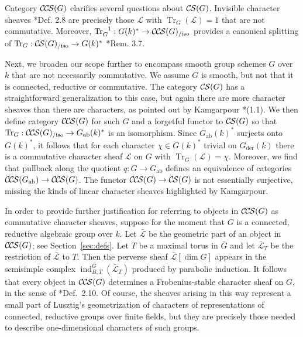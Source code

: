 \documentclass[10pt]{amsart}
\theoremstyle{plain}
\theoremstyle{definition}
\newcommand{\Fq}{k}
\newcommand{\der}{_{\operatorname{der}}}
\newcommand{\ab}{_{\operatorname{ab}}}
\DeclareMathOperator{\Tr}{Tr}
\newcommand{\TrFrob}[1]{\Tr_{#1}}
\newcommand{\cs}[1]{{\mathcal{#1}}}
\newcommand{\gcs}[1]{{\mathcal{\bar #1}}}
\newcommand{\CS}{{\mathcal{C\hskip-0.8pt S}}}
\newcommand{\CCS}{{\mathcal{C\hskip-.8pt C\hskip-0.8pt S}}}
\newcommand{\CSiso}[1]{\CS(#1)_{/\text{iso}}}
\newcommand{\CCSiso}[1]{\CCS(#1)_{/\text{iso}}}
\newcommand{\bG}{\bar{G}}
\begin{document}
Category $\CCS(G)$ clarifies several questions about $\CS(G)$. 
Invisible character sheaves \cite{cunningham-roe:13a}*{Def. 2.8} are precisely those $\cs{L}$ with $\TrFrob{G}(\cs{L}) = 1$ that are not commutative.  Moreover, $\TrFrob{G}^{-1} : G(k)^* \to \CCSiso{G}$ provides a canonical splitting of $\TrFrob{G} : \CSiso{G} \to G(k)^*$ \cite{cunningham-roe:13a}*{Rem. 3.7}.

Next, we broaden our scope further to encompass smooth group schemes $G$ over $\Fq$ that are not necessarily commutative.
We assume $G$ is smooth, but not that it is connected, reductive or commutative. 
The category $\CS(G)$ has a straightforward generalization to this case, but again
there are more character sheaves than there are characters, as pointed out by Kamgarpour \cite{kamgarpour:09a}*{(1.1)}.
We then define category $\CCS(G)$ for such $G$ and a forgetful functor to $\CS(G)$ so that $\TrFrob{G} : \CCSiso{G} \to G\ab(k)^*$
is an isomorphism.  
Since $G\ab(k)^*$ surjects onto $G(k)^*$, it follows that for each character $\chi \in G(k)^*$ trivial on $G\der(k)$ there is a commutative
character sheaf $\cs{L}$ on $G$ with $\TrFrob{G}(\cs{L}) = \chi$. Moreover, we find that pullback along the quotient $q : G \to G\ab$
defines an equivalence of categories $\CCS(G\ab) \to \CCS(G)$.  
The functor $\CCS(G) \to \CS(G)$ is not
essentially surjective, missing the kinds of linear character sheaves highlighted by Kamgarpour.

In order to provide further justification for referring to objects in $\CCS(G)$ as commutative character sheaves, suppose for the moment that $G$ is a connected, reductive algebraic group over $\Fq$.
Let $\gcs{L}$ be the geometric part of an object in $\CCS(G)$; see Section~\ref{sec:defs}.
Let $T$ be a maximal torus in $\bG$ and let $\gcs{L}_T$ be the restriction of $\gcs{L}$ to $T$.
Then the perverse sheaf $\gcs{L}[\dim G]$ appears in the semisimple complex $\operatorname{ind}_{B,T}^{\bG}(\gcs{L}_T)$ produced by parabolic induction.
It follows that every object in $\CCS(G)$ determines a Frobenius-stable character sheaf on $G$, in the sense of \cite{lusztig:85a}*{Def.~2.10}.
Of course, the sheaves arising in this way represent a small part of Lusztig's geometrization of characters of representations of connected, reductive groups over finite fields, but they are precisely those needed to describe one-dimensional characters of such groups. 
\end{document}

